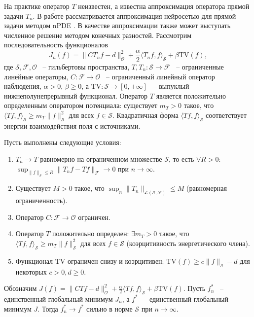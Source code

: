\documentclass[a4paper,14pt,oneside,openany]{extarticle}
\begin{document}
На практике оператор $T$ неизвестен, а известна аппроксимация оператора прямой задачи $T_n$. В работе
рассматривается аппроксимация нейросетью для прямой задачи методом nPDE \cite{Zubov2021}. В качестве
аппроксимации также может выступать численное решение методом конечных разностей. Рассмотрим 
последовательность функционалов
\begin{equation}
    J_n(f)=\|C T_n f - d\|_{\mathcal{O}}^2 + \frac{\alpha}{2} \langle T_n f, f\rangle_{\mathcal{S}} + \beta \mathrm{TV}(f),
\end{equation}
где $\mathcal{S}, \mathcal{F}, \mathcal{O}$ ~-- гильбертовы пространства, 
$T, T_n: \mathcal{S} \to \mathcal{F}$ ~-- ограниченные линейные операторы, 
$C: \mathcal{F} \to \mathcal{O}$ ~-- ограниченный линейный оператор наблюдения, 
$\alpha>0$, $\beta\ge0$, а $\mathrm{TV}: \mathcal{S} \to [0,+\infty]$ 
~-- выпуклый нижнеполунепрерывный функционал. Оператор $T$ является положительно 
определенным оператором потенциала: существует $m_T > 0$ такое, что 
$\langle T f, f\rangle_{\mathcal{S}} \ge m_T \|f\|_{\mathcal{S}}^2$ для всех $f \in \mathcal{S}$. 
Квадратичная форма $\langle T f, f\rangle_{\mathcal{S}}$ соответствует энергии взаимодействия поля 
с источниками.

\begin{theorem}\label{th:minimizers_convergence}
Пусть выполнены следующие условия:
\begin{enumerate}
    \item $T_n \to T$ равномерно на ограниченном множестве $\mathcal{S}$, то есть 
    $\forall R>0$: $\sup_{\|f\|_{\mathcal{S}} \le R} \|T_n f - T f\|_{\mathcal{F}} \to 0$ 
    при $n\to\infty$.
    \item Существует $M>0$ такое, что $\sup_n \|T_n\|_{\mathcal{L}(\mathcal{S},\mathcal{F})} 
    \le M$ (равномерная ограниченность).
    \item Оператор $C: \mathcal{F} \to \mathcal{O}$ ограничен.
    \item Оператор $T$ положительно определен: $\exists m_T>0$ такое, 
    что $\langle T f, f\rangle_{\mathcal{S}} \ge m_T \|f\|_{\mathcal{S}}^2$ для всех 
    $f \in \mathcal{S}$ (коэрцитивность энергетического члена).
    \item Функционал $\mathrm{TV}$ ограничен снизу и коэрцитивен: 
    $\mathrm{TV}(f) \ge c \|f\|_{\mathcal{S}} - d$ для некоторых $c>0, d\ge0$.
\end{enumerate}
Обозначим $J(f) = \|C T f - d\|_{\mathcal{O}}^2 + \frac{\alpha}{2} 
\langle T f, f\rangle_{\mathcal{S}} + \beta \mathrm{TV}(f)$.
Пусть $f_n^*$ ~-- единственный глобальный минимум $J_n$, а $f^*$ 
~-- единственный глобальный минимум $J$.
Тогда $f_n^* \to f^*$ сильно в норме $\mathcal{S}$ при $n\to\infty$.
\end{theorem}
\end{document}
